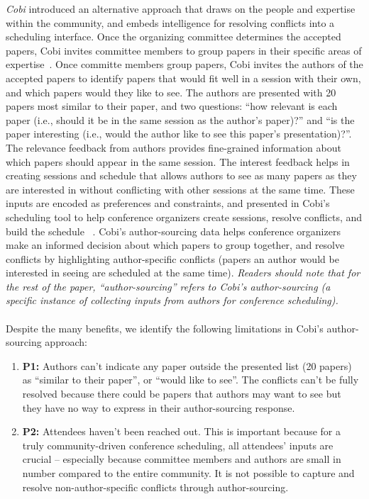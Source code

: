 \documentclass[letterpaper]{article}
\begin{document}
\emph {Cobi} introduced an alternative approach that draws on the people and expertise within the community, and embeds intelligence for resolving conflicts into a scheduling interface. Once the organizing committee determines the accepted papers, Cobi invites committee members to group papers in their specific areas of expertise~\cite{FrenzyCHI2014}. Once committe members group papers, Cobi invites the authors of the accepted papers to identify papers that would fit well in a session with their own, and which papers would they like to see.  The authors are presented with 20 papers most similar to their paper, and two questions: ``how relevant is each paper (i.e., should it be in the same session as the author's paper)?'' and ``is the paper interesting (i.e., would the author like to see this paper's presentation)?''. The relevance feedback from authors provides fine-grained information about which papers should appear in the same session. The interest feedback helps in creating sessions and schedule that allows authors to see as many papers as they are interested in without conflicting with other sessions at the same time. These inputs are encoded as preferences and constraints, and presented in Cobi's scheduling tool to help conference organizers create sessions, resolve conflicts, and build the schedule ~\cite{CobiUIST2013}. Cobi's author-sourcing data helps conference organizers make an informed decision about which papers to group together, and resolve conflicts by highlighting author-specific conflicts (papers an author would be interested in seeing are scheduled at the same time). \emph{Readers should note that for the rest of the paper, \emph{``author-sourcing''} refers to Cobi's author-sourcing (a specific instance of collecting inputs from authors for conference scheduling).}
\\
\\
Despite the many benefits, we identify the following limitations in Cobi's author-sourcing approach:
\begin{enumerate}
\item \textbf{P1:} Authors can't indicate any paper outside the presented list (20 papers) as ``similar to their paper'', or ``would like to see''. The conflicts can't be fully resolved because there could be papers that authors may want to see but they have no way to express in their author-sourcing response.
\item \textbf{P2:} Attendees haven't been reached out. This is important because for a truly community-driven conference scheduling, all attendees' inputs are crucial -- especially because committee members and authors are small in number compared to the entire community. It is not possible to capture and resolve non-author-specific conflicts through author-sourcing.
\end{enumerate}
\end{document}
